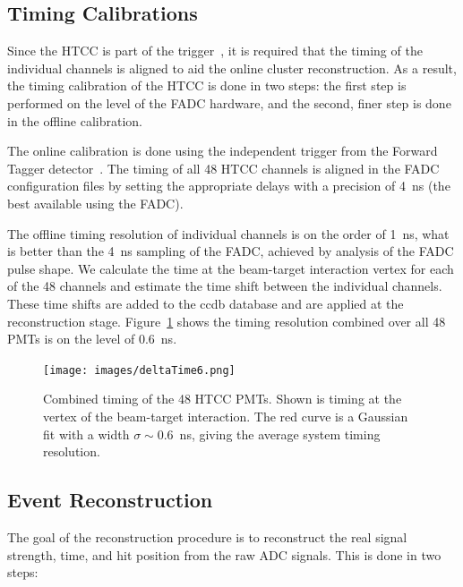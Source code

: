 \subsection{Timing Calibrations}

Since the HTCC is part of the trigger~\cite{trigger-nim}, it is required that the timing of the individual
channels is aligned to aid the online cluster reconstruction. As a result, the timing calibration of the HTCC is done in two steps: the first step is performed on the level of the FADC hardware, and the second, finer step is done in the offline calibration.

The online calibration is done using the independent trigger from the Forward Tagger detector~\cite{ft-nim}. The
timing of all 48 HTCC channels is aligned in the FADC configuration files by setting the appropriate delays with a
precision of 4~ns (the best available using the FADC). 

The offline timing resolution of individual channels is on the order of 1~ns, what is better than the 4~ns sampling of the FADC, achieved by analysis of the FADC pulse shape. We calculate the time at the beam-target interaction vertex for each of the 48 channels and estimate the time shift between the individual channels. These time shifts are added to the ccdb database and are applied at the reconstruction stage. Figure~\ref{fig:htcccombinedTimingResponce} shows the timing resolution combined over all 48 PMTs is on the level of 0.6~ns.

\begin{figure}[ht]
\centering
\texttt{[image: images/deltaTime6.png]}
\caption{Combined timing of the 48 HTCC PMTs. Shown is timing at the vertex of the beam-target interaction. The red curve is a Gaussian fit with a width $\sigma \sim$0.6~ns,
  giving the average system timing resolution.}
\label{fig:htcccombinedTimingResponce}
\end{figure}

\subsection{Event Reconstruction}

The goal of the reconstruction procedure is to reconstruct the real signal strength, time, and hit position from the
raw ADC signals. This is done in two steps:

